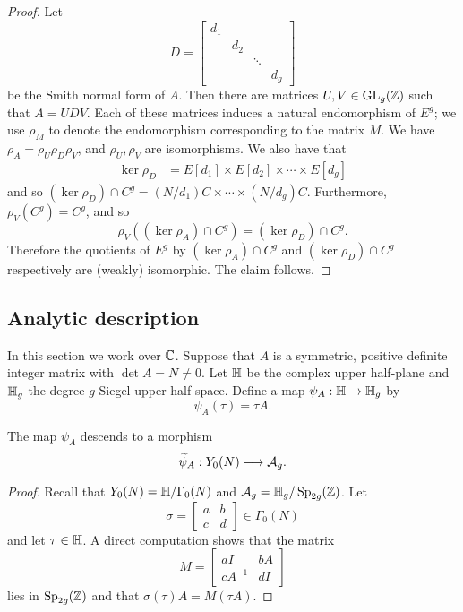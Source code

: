 \documentclass{amsart}
\begin{document}
\begin{proof}
  Let
   \[
     D =
    \begin{bmatrix}
      {d_1} & & & \\
      & {d_2} & & \\
      & & \ddots & \\
      & & & {d_{g}}
    \end{bmatrix}
  \]
  be the Smith normal form of $A$. Then there are matrices $U,V \in \operatorname{GL}_g(\mathbb{Z})$ such that $A = UDV$. Each of these matrices induces a natural endomorphism of $E^g$; we use $\rho_M$ to denote the endomorphism corresponding to the matrix $M$. We have $\rho_A = \rho_U \rho_D \rho_V$, and $\rho_U, \rho_V$ are isomorphisms. We also have that
  \begin{align*}
    \ker \rho_D &= E[d_1] \times E[d_2] \times \cdots \times E[d_g]
  \end{align*}
  and so $(\ker \rho_D) \cap C^g = (N/d_1)C \times \cdots \times (N/d_g)C$. Furthermore, $\rho_V(C^g) = C^g$, and so
  \[
    \rho_V((\ker \rho_A) \cap C^g) = (\ker \rho_D) \cap C^g.
  \]
  Therefore the quotients of $E^g$ by $(\ker \rho_A) \cap C^g$ and $(\ker \rho_D) \cap C^g$ respectively are (weakly) isomorphic. The claim follows.
\end{proof}

\subsection{Analytic description}
\label{sec:ana-desc}

In this section we work over $\mathbb{C}$. Suppose that $A$ is a symmetric, positive definite integer matrix with $\det A = N \neq 0$. Let $\mathbb{H}$ be the complex upper half-plane and $\mathbb{H}_g$ the degree $g$ Siegel upper half-space. Define a map $\psi_A: \mathbb{H} \to \mathbb{H}_g$ by
\[
  \psi_A(\tau) = \tau A.
\]
\begin{proposition}
The map $\psi_A$ descends to a morphism
\begin{equation}\label{def:psi-A-n}
  \widetilde{\psi}_{A}: Y_0(N) \longrightarrow \mathcal{A}_g.
\end{equation}
\end{proposition}

\begin{proof}
Recall that $Y_0(N) = \mathbb{H}/\Gamma_0(N)$ and $\mathcal{A}_g = \mathbb{H}_g/\operatorname{Sp}_{2g}(\mathbb{Z})$. Let
\[
\sigma = \begin{bmatrix} a & b \\ c & d \end{bmatrix} \in \Gamma_0(N)
\]
and let $\tau \in \mathbb{H}$. A direct computation shows that the matrix
\[
M = \begin{bmatrix} aI & bA \\ cA^{-1} & dI \end{bmatrix}
\]
lies in $\operatorname{Sp}_{2g}(\mathbb{Z})$
and that $\sigma(\tau)A = M(\tau A)$.
\end{proof}
\end{document}
